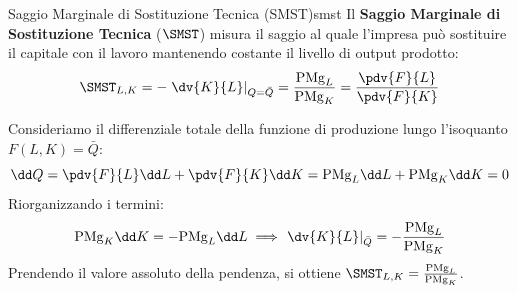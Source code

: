 \begin{definizione}{Saggio Marginale di Sostituzione Tecnica (SMST)}{smst}
Il \textbf{Saggio Marginale di Sostituzione Tecnica} ($\SMST$) misura il saggio al quale l'impresa può sostituire il capitale con il lavoro mantenendo costante il livello di output prodotto:
\begin{equation}
    \SMST_{L, K} = -\left. \dv{K}{L} \right|_{Q = \bar{Q}} = \frac{\mathrm{PMg}_L}{\mathrm{PMg}_K} = \frac{\pdv{F}{L}}{\pdv{F}{K}}
\end{equation}
\end{definizione}

\begin{dimostrazione}
Consideriamo il differenziale totale della funzione di produzione lungo l'isoquanto $F(L, K) = \bar{Q}$:
\begin{equation*}
    \dd Q = \pdv{F}{L} \dd L + \pdv{F}{K} \dd K = \mathrm{PMg}_L \dd L + \mathrm{PMg}_K \dd K = 0
\end{equation*}
Riorganizzando i termini:
\begin{equation*}
    \mathrm{PMg}_K \dd K = -\mathrm{PMg}_L \dd L \implies \left. \dv{K}{L} \right|_{\bar{Q}} = -\frac{\mathrm{PMg}_L}{\mathrm{PMg}_K}
\end{equation*}
Prendendo il valore assoluto della pendenza, si ottiene $\SMST_{L, K} = \frac{\mathrm{PMg}_L}{\mathrm{PMg}_K}$.
\end{dimostrazione}

